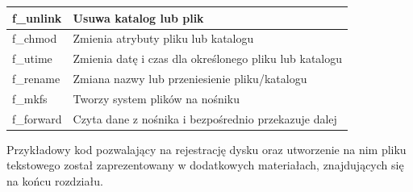 \documentclass[11pt, a4paper]{article}
\begin{document}
\begin{table}[h!]
{\begin{tabular}{|l|l|}
f\_unlink        & Usuwa katalog lub plik                                               \\ \hline
f\_chmod         & Zmienia atrybuty pliku lub katalogu                                  \\ \hline
f\_utime         & Zmienia datę i czas dla określonego pliku lub katalogu               \\ \hline
f\_rename        & Zmiana nazwy lub przeniesienie pliku/katalogu                        \\ \hline
f\_mkfs          & Tworzy system plików na nośniku                                      \\ \hline
f\_forward       & Czyta dane z nośnika i bezpośrednio przekazuje dalej                 \\ \hline
\end{tabular}%
}
\end{table}
\newline
Przykładowy kod pozwalający na rejestrację dysku oraz utworzenie na nim pliku tekstowego został zaprezentowany w dodatkowych materiałach, znajdujących się na końcu rozdziału. \\
\end{document}
